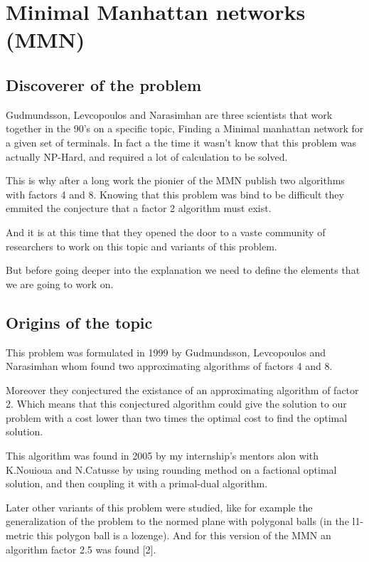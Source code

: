 \chapter{Minimal Manhattan networks (MMN)}
\section{Discoverer of the problem}%
Gudmundsson, Levcopoulos and Narasimhan are three scientists that work together in the 90's on a specific topic, Finding a Minimal manhattan network for a given set of terminals. In fact a the time it wasn't know that this problem was actually NP-Hard, and required a lot of calculation to be solved.

This is why after a long work the pionier of the MMN publish two algorithms with factors 4 and 8. Knowing that this problem was bind to be difficult they emmited the conjecture that a factor 2 algorithm must exist.

And it is at this time that they opened the door to a vaste community of researchers to work on this topic and variants of this problem.

But before going deeper into the explanation we need to define the elements that we are going to work on. 

\section{Origins of the topic}%
This problem was formulated in 1999 by Gudmundsson, Levcopoulos and Narasimhan whom found two approximating algorithms of factors 4 and 8. 

Moreover they conjectured the existance of an approximating algorithm of factor 2. Which means that this conjectured algorithm could give the solution to our problem with a cost lower than two times the optimal cost to find the optimal solution.

This algorithm was found in 2005 by my internship's mentors alon with K.Nouioua and N.Catusse by using rounding method on a factional optimal solution, and then coupling it with a primal-dual algorithm.

Later other variants of this problem were studied, like for example the generalization of the problem to the normed plane with polygonal balls (in the l1-metric this polygon ball is a lozenge). And for this version of the MMN an algorithm factor 2.5 was found [2].

